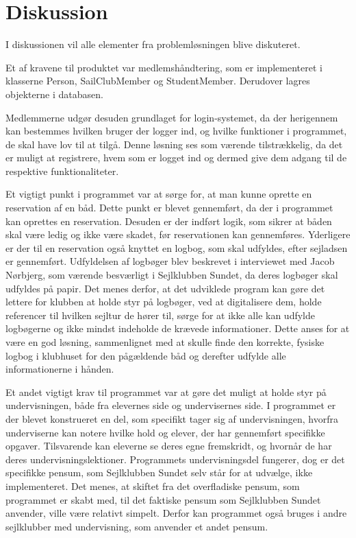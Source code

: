 \chapter{Diskussion}

I diskussionen vil alle elementer fra problemløsningen blive diskuteret. 

Et af kravene til produktet var medlemshåndtering, som er implementeret i klasserne Person, SailClubMember og StudentMember. 
Derudover lagres objekterne i databasen. 

Medlemmerne udgør desuden grundlaget for login-systemet, da der herigennem kan bestemmes hvilken bruger der logger ind, og hvilke funktioner i programmet, de skal have lov til at tilgå.  
Denne løsning ses som værende tilstrækkelig, da det er muligt at registrere, hvem som er logget ind og dermed give dem adgang til de respektive funktionaliteter. 

Et vigtigt punkt i programmet var at sørge for, at man kunne oprette en reservation af en båd. 
Dette punkt er blevet gennemført, da der i programmet kan oprettes en reservation. 
Desuden er der indført logik, som sikrer at båden skal være ledig og ikke være skadet, før reservationen kan gennemføres. 
Yderligere er der til en reservation også knyttet en logbog, som skal udfyldes, efter sejladsen er gennemført. 
Udfyldelsen af logbøger blev beskrevet i interviewet med Jacob Nørbjerg, som værende besværligt i Sejlklubben Sundet, da deres logbøger skal udfyldes på papir. 
Det menes derfor, at det udviklede program kan gøre det lettere for klubben at holde styr på logbøger, ved at digitalisere dem, holde referencer til hvilken sejltur de hører til, sørge for at ikke alle kan udfylde logbøgerne og ikke mindst indeholde de krævede informationer. 
Dette anses for at være en god løsning, sammenlignet med at skulle finde den korrekte, fysiske logbog i klubhuset for den pågældende båd og derefter udfylde alle informationerne i hånden. 

Et andet vigtigt krav til programmet var at gøre det muligt at holde styr på undervisningen, både fra elevernes side og undervisernes side. 
I programmet er der blevet konstrueret en del, som specifikt tager sig af undervisningen, hvorfra underviserne kan notere hvilke hold og elever, der har gennemført specifikke opgaver.
Tilsvarende kan eleverne se deres egne fremskridt, og hvornår de har deres undervisningslektioner.
Programmets undervisningsdel fungerer, dog er det specifikke pensum, som Sejlklubben Sundet selv står for at udvælge, ikke implementeret. 
Det menes, at skiftet fra det overfladiske pensum, som programmet er skabt med, til det faktiske pensum som Sejlklubben Sundet anvender, ville være relativt simpelt. 
Derfor kan programmet også bruges i andre sejlklubber med undervisning, som anvender et andet pensum.

